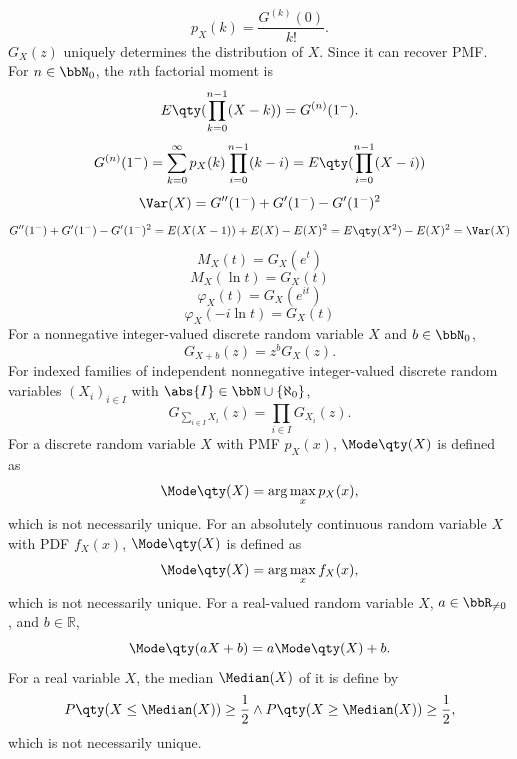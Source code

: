 \documentclass[a4paper,12pt]{report}
\begin{document}
\[p_X(k)=\frac{G^{(k)}(0)}{k!}.\]
$G_X(z)$ uniquely determines the distribution of $X$.
\bpr
Since it can recover PMF.
\epr
{}
For $n\in\bbN_0$, the $n$th factorial moment is
\[E\qty(\prod_{k=0}^{n-1}(X-k))=G^{(n)}(1^-).\]
\bpr
\[G^{(n)}(1^-)=\sum_{k=0}^{\infty}p_X(k)\prod_{i=0}^{n-1}(k-i)=E\qty(\prod_{i=0}^{n-1}(X-i))\]
\epr
{}
\[\Var(X)=G''(1^-)+G'(1^-)-G'(1^-)^2\]
\bpr
\[G''(1^-)+G'(1^-)-G'(1^-)^2=E(X(X-1))+E(X)-E(X)^2=E\qty(X^2)-E(X)^2=\Var(X)\]
\epr
{}
\[M_X(t)=G_X(e^t)\]
\[M_X(\ln t)=G_X(t)\]
\[\varphi_X(t)=G_X(e^{it})\]
\[\varphi_X(-i\ln t)=G_X(t)\]
For a nonnegative integer-valued discrete random variable $X$ and $b\in\bbN_0$,
\[G_{X+b}(z)=z^bG_X(z).\]
For indexed families of independent nonnegative integer-valued discrete random variables $(X_i)_{i\in I}$ with $\abs{I}\in\bbN\cup\{\aleph_0\}$,
\[G_{\sum_{i\in I}X_i}(z)=\prod_{i\in I}G_{X_i}(z).\]
For a discrete random variable $X$ with PMF $p_X(x)$, $\Mode\qty(X)$ is defined as
\[\Mode\qty(X)=\arg\max_xp_X(x),\]
which is not necessarily unique.
For an absolutely continuous random variable $X$ with PDF $f_X(x)$, $\Mode\qty(X)$ is defined as
\[\Mode\qty(X)=\arg\max_xf_X(x),\]
which is not necessarily unique.
For a real-valued random variable $X$, $a\in\bbR_{\neq0}$, and $b\in\mathbb{R}$,
\[\Mode\qty(aX+b)=a\Mode\qty(X)+b.\]
For a real variable \( X \), the median 
$\Median(X)$ of it is define by
\[P\qty(X\leq\Median(X))\geq\frac{1}{2}\land P\qty(X\geq\Median(X))\geq\frac{1}{2},\]
which is not necessarily unique.
\end{document}
